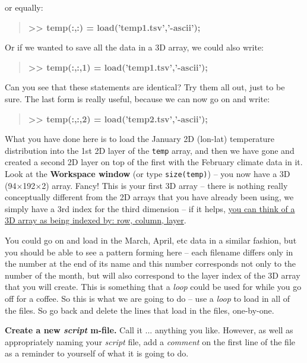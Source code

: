 \documentclass{tufte-book} %
\newenvironment{docspecbold}{\begin{quotation}\ttfamily\bfseries\parskip0pt\parindent0pt\ignorespaces}{\end{quotation}}
\begin{document}
or equally:

\begin{docspecbold}
>> temp(:,:) = load('temp1.tsv','-ascii');
\end{docspecbold}

Or if we wanted to save all the data in a 3D array, we could also write:

\begin{docspecbold}
>> temp(:,:,1) = load('temp1.tsv','-ascii');
\end{docspecbold}

Can you see that these statements are identical? Try them all out, just to be sure. The last form is really useful, because we can now go on and write:

\begin{docspecbold}
>> temp(:,:,2) = load('temp2.tsv','-ascii');
\end{docspecbold}

What you have done here is to load the January 2D (lon-lat) temperature distribution into the 1st 2D layer of the \texttt{temp} array, and then we have gone and created a second 2D layer on top of the first with the February climate data in it. Look at the \textbf{Workspace window} (or type \texttt{size(temp)}) -- you now have a 3D (94\(\times\)192\(\times\)2) array. Fancy! This is your first 3D array -- there is nothing really conceptually different from the 2D arrays that you have already been using, we simply have a 3rd index for the third dimension -- if it helps, \uline{you can think of a 3D array as being indexed by: row, column, layer}. 

You could go on and load in the March, April, etc data in a similar fashion, but you should be able to see a pattern forming here -- each filename differs only in the number at the end of its name and this number corresponds not only to the number of the month, but will also correspond to the layer index of the 3D array that you will create. This is something that a \textit{loop} could be used for while you go off for a coffee. So this is what we are going to do -- use a \textit{loop} to load in all of the files. So go back and delete the lines that load in the files, one-by-one.

\textbf{Create a new \textit{script} \textsf{m-file}.} Call it ... anything you like. However, as well as appropriately naming your \textit{script} file, add a \textit{comment} on the first line of the file as a reminder to yourself of what it is going to do.
\end{document}
